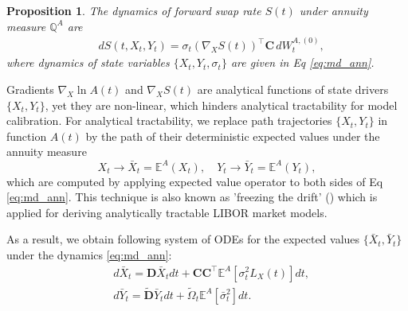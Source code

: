 \documentclass[pdftex,11pt,a4paper] {article}
\newtheorem{proposition}{Proposition}[section]
\begin{document}
\begin{proposition}
The dynamics of forward swap rate $S(t)$ under annuity measure $\mathbb{Q}^A$ are
\begin{equation}\label{eq:md_ann_s}
\begin{split}
&dS(t,X_t,Y_t)=\sigma_t\left(\nabla_X S(t)\right)^\top\mathbf{C}\, dW^{A,(0)}_t,
\end{split}
\end{equation}
where dynamics of state variables $\{X_t, Y_t, \sigma_t\}$ are given in Eq \eqref{eq:md_ann}.
\end{proposition}

Gradients $\nabla_X \ln A(t)$ and $\nabla_X S(t)$ are analytical functions of state drivers $\{X_t, Y_t\}$, yet they are non-linear, which hinders analytical tractability for model calibration. 
For analytical tractability, we replace path trajectories $\{X_t, Y_t\}$ in function $A(t)$ by the path of their deterministic expected values under the annuity measure
\begin{equation}\label{eq:mean_states}
X_t \rightarrow \bar X_t=\mathbb{E}^A(X_t),\quad Y_t \rightarrow  \bar Y_t=\mathbb{E}^A(Y_t),
\end{equation}
which are computed by applying expected value operator to both sides of Eq \eqref{eq:md_ann}. This technique is also known as 'freezing the drift' (\cite{BrigoMercurio2007}) which is applied for deriving analytically tractable LIBOR market models.

As a result, we obtain following system of ODEs for the expected values $\{\bar X_t, \bar Y_t\}$ under the dynamics \eqref{eq:md_ann}:
\begin{equation}\label{eq:md_ann2}
\begin{split}
&   d\bar X_{t} = \mathbf{D} \bar X_{t}dt  + \mathbf{C}\mathbf{C}^\top \mathbb{E}^A\left[\sigma_{t}^2L_X(t)\right]dt, \\
& d\bar Y_{t} = \tilde{\mathbf{D}}\bar Y_{t}dt + \tilde\Omega_{t}\mathbb{E}^A[\bar\sigma_t^2]dt.
\end{split}
\end{equation}
\end{document}
